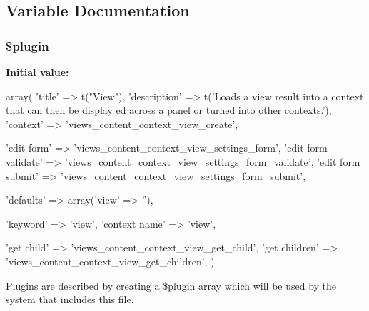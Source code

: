 \subsection{Variable Documentation}
\hypertarget{ctools_2views__content_2plugins_2contexts_2view_8inc_ada8a7130088351710bb02ed622d6bf65}{
\subsubsection[{\$plugin}]{\setlength{\rightskip}{0pt plus 5cm}\$plugin}}
\label{ctools_2views__content_2plugins_2contexts_2view_8inc_ada8a7130088351710bb02ed622d6bf65}
{\bfseries Initial value:}
\begin{DoxyCode}
 array(
  'title' => t("View"),
  'description' => t('Loads a view result into a context that can then be display
      ed across a panel or turned into other contexts.'),
  'context' => 'views_content_context_view_create',

  'edit form' => 'views_content_context_view_settings_form',
  'edit form validate' => 'views_content_context_view_settings_form_validate',
  'edit form submit' => 'views_content_context_view_settings_form_submit',

  'defaults' => array('view' => ''),

  'keyword' => 'view',
  'context name' => 'view',

  'get child' => 'views_content_context_view_get_child',
  'get children' => 'views_content_context_view_get_children',
)
\end{DoxyCode}
Plugins are described by creating a \$plugin array which will be used by the system that includes this file. 